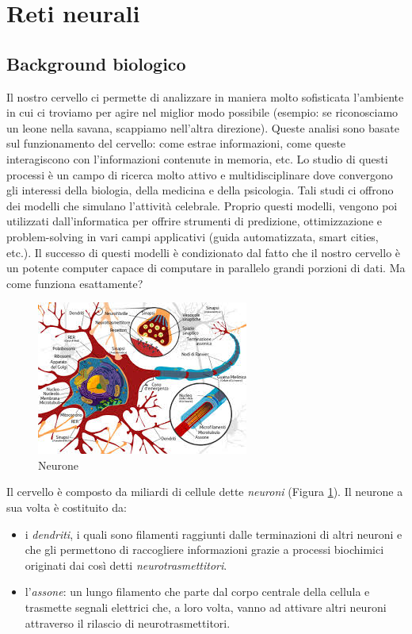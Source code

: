 \documentclass[10pt,a4paper]{article}
\begin{document}
\section{Reti neurali}

\subsection{Background biologico}

Il nostro cervello ci permette di analizzare in maniera molto sofisticata l'ambiente in cui ci troviamo per agire nel miglior modo possibile (esempio: se riconosciamo un leone nella savana, scappiamo nell'altra direzione). Queste analisi sono basate sul funzionamento del cervello: come estrae informazioni, come queste interagiscono con l'informazioni contenute in memoria, etc. Lo studio di questi processi è un campo di ricerca molto attivo e multidisciplinare dove convergono gli interessi della biologia, della medicina e della psicologia.
Tali studi ci offrono dei modelli che simulano l'attività celebrale. Proprio questi modelli, vengono poi utilizzati dall'informatica per offrire strumenti di predizione, ottimizzazione e problem-solving in vari campi applicativi (guida automatizzata, smart cities, etc.). Il successo di questi modelli è condizionato dal fatto che il nostro cervello è un potente computer capace di computare in parallelo grandi porzioni di dati. Ma come funziona esattamente?

\begin{figure}
\centering
\includegraphics[scale=0.7]{img/neurone.jpeg}
\caption{Neurone}
\label{fig:1}
\end{figure}

Il cervello è composto da miliardi di cellule dette \emph{neuroni} (Figura \ref{fig:1}). Il neurone a sua volta è costituito da:
\begin{itemize}
\item{i \emph{dendriti}, i quali sono filamenti raggiunti dalle terminazioni di altri neuroni e che gli permettono di raccogliere informazioni grazie a processi biochimici originati dai così detti \emph{neurotrasmettitori}.}
\item{l'\emph{assone}: un lungo filamento che parte dal corpo centrale della cellula e trasmette segnali elettrici che, a loro volta, vanno ad attivare altri neuroni attraverso il rilascio di neurotrasmettitori.}
\end{itemize}
\end{document}
